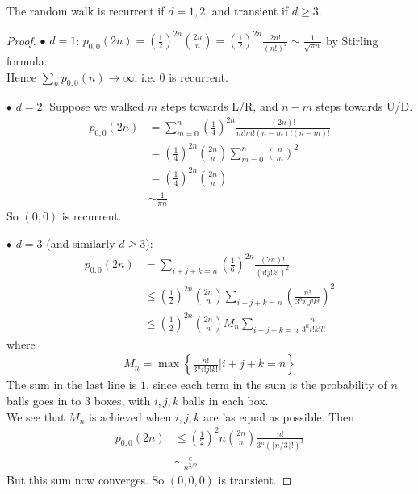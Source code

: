 \documentclass[a4paper]{article}
\begin{document}
\begin{thm}
The random walk is recurrent if $d = 1,2$, and transient if $d \geq 3$.
\begin{proof}
$\bullet$ $d=1$: $p_{0,0}\left(2n\right) = \left(\frac{1}{2}\right)^{2n} {2n \choose n} = \left(\frac{1}{2}\right)^{2n} \frac{2n!}{\left(n!\right)^2} \sim \frac{1}{\sqrt{\pi n}}$ by Stirling formula.\\
Hence $\sum_n p_{0,0}\left(n\right) \to \infty$, i.e. $0$ is recurrent.

$\bullet$ $d=2$: Suppose we walked $m$ steps towards L/R, and $n-m$ steps towards U/D.
\begin{equation*}
\begin{aligned}
p_{0,0} \left(2n\right) &= \sum_{m=0}^n \left(\frac{1}{4}\right)^{2n} \frac{\left(2n\right)!}{m!m!\left(n-m\right)!\left(n-m\right)!}\\
&= \left(\frac{1}{4}\right)^{2n} {2n \choose n} \sum_{m=0}^n {n \choose m}^2\\
&= \left(\frac{1}{4}\right)^{2n} {2n \choose n}\\
&\sim \frac{1}{\pi n}
\end{aligned}
\end{equation*}
So $\left(0,0\right)$ is recurrent.

$\bullet$ $d=3$ (and similarly $d \geq 3$):\\
\begin{equation*}
\begin{aligned}
p_{0,0}\left(2n\right) &= \sum_{i+j+k=n} \left(\frac{1}{6}\right)^{2n} \frac{\left(2n\right)!}{\left(i!j!k!\right)^2}\\
&\leq \left(\frac{1}{2}\right)^{2n} {2n \choose n} \sum_{i+j+k=n} \left(\frac{n!}{3^n i!j!k!}\right)^2\\
&\leq \left(\frac{1}{2}\right)^{2n} {2n \choose n} M_n \sum_{i+j+k=n} \frac{n!}{3^n i!k!l!}
\end{aligned}
\end{equation*}
where
\begin{equation*}
\begin{aligned}
M_n=\max\left\{\frac{n!}{3^n i!j!k!} | i+j+k=n\right\}
\end{aligned}
\end{equation*}
The sum in the last line is $1$, since each term in the sum is the probability of $n$ balls goes in to 3 boxes, with $i,j,k$ balls in each box.\\
We see that $M_n$ is achieved when $i,j,k$ are 'as equal as possible. Then
\begin{equation*}
\begin{aligned}
p_{0,0}\left(2n\right) &\leq \left(\frac{1}{2}\right)^2n {2n \choose n} \frac{n!}{3^n \left(\lfloor n/3\rfloor !\right)^3}\\
&\sim \frac{c}{n^{3/2}}
\end{aligned}
\end{equation*}
But this sum now converges. So $\left(0,0,0\right)$ is transient.
\end{proof}
\end{thm}
\end{document}
